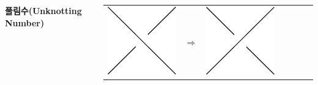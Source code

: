 \documentclass[25pt, a0paper, portrait, margin=0mm, innermargin=15mm,
     blockverticalspace=15mm, colspace=15mm, subcolspace=8mm]{tikzposter}
\def\mysection#1{\textbf{\Large\color{NTNUBlue}\sf #1}\par}
\begin{document}
\begin{columns}
{\bigskip\bigskip
\mysection{풀림수(Unknotting Number)}
\bigskip
\begin{center}
\begin{tabu} to .7\linewidth{X[2,m,c] X[1,m,c] X[2,m,c] X[2,m,c] X[2,m,c] X[1,m,c] X[2,m,c]}
\includegraphics[width=\linewidth]{crossing}
& $\Longrightarrow$ & \includegraphics[width=\linewidth]{crossing2} &

\end{tabu}
\end{center}}
\end{columns}
\end{document}
